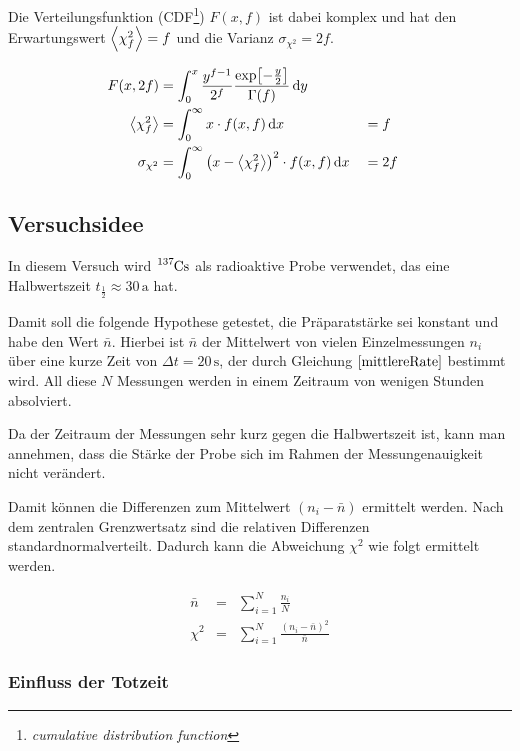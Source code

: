 \documentclass[12pt,a4paper]{scrartcl}
\numberwithin{equation}{section} %
\renewcommand{\[}{} %
\renewcommand{\]}{\noindent} %
\begin{document}
Die Verteilungsfunktion (CDF\footnote{\emph{cumulative distribution
  function}}) \(F(x, f)\) ist dabei komplex und hat den Erwartungswert
\(\expval{\chi_f^2}=f\) und die Varianz \(\sigma_{\chi^2}=2f\).

\[
\begin{align}
    F(x, 2f) &=
        \int_0^x
            \frac{y^{f-1}}{2^f}
                \frac{\exp[-\frac{y}{2}]}{\Gamma(f)}
            \,\mathrm dy \\
    \expval{\chi_f^2} &=
        \int_0^\infty x\cdot f(x, f)
            \,\mathrm dx
        &&= f \\
    \sigma_{\chi^2} &=
        \int_0^\infty \left(x - \expval{\chi_f^2}\right)^2 \cdot f(x, f)
            \,\mathrm dx
         &&=2f
\end{align}
\]

\hypertarget{versuchsidee}{%
\subsection{Versuchsidee}\label{versuchsidee}}

In diesem Versuch wird \(\ce{^{137}Cs}\) als radioaktive Probe
verwendet, das eine Halbwertszeit \(t_\frac{1}{2}\approx 30\,\mathrm a\)
hat.

Damit soll die folgende Hypothese getestet, die Präparatstärke sei
konstant und habe den Wert \(\bar n\). Hierbei ist \(\bar n\) der
Mittelwert von vielen Einzelmessungen \(n_i\) über eine kurze Zeit von
\(\Delta t=20\,\mathrm s\), der durch Gleichung \(\eqref{mittlereRate}\)
bestimmt wird. All diese \(N\) Messungen werden in einem Zeitraum von
wenigen Stunden absolviert.

Da der Zeitraum der Messungen sehr kurz gegen die Halbwertszeit ist,
kann man annehmen, dass die Stärke der Probe sich im Rahmen der
Messungenauigkeit nicht verändert.

Damit können die Differenzen zum Mittelwert \((n_i-\bar n)\) ermittelt
werden. Nach dem zentralen Grenzwertsatz sind die relativen Differenzen
standardnormalverteilt. Dadurch kann die Abweichung \(\chi^2\) wie folgt
ermittelt werden.

\[
\begin{eqnarray}
    \bar n &=& \sum_{i=1}^N \frac{n_i}{N} \label{mittlereRate} \\
    \chi^2 &=& \sum_{i=1}^N \frac{(n_i-\bar n)^2}{\bar n} \label{ChiSquared}
\end{eqnarray}
\]

\hypertarget{einfluss-der-totzeit}{%
\subsubsection{Einfluss der Totzeit}\label{einfluss-der-totzeit}}
\end{document}
